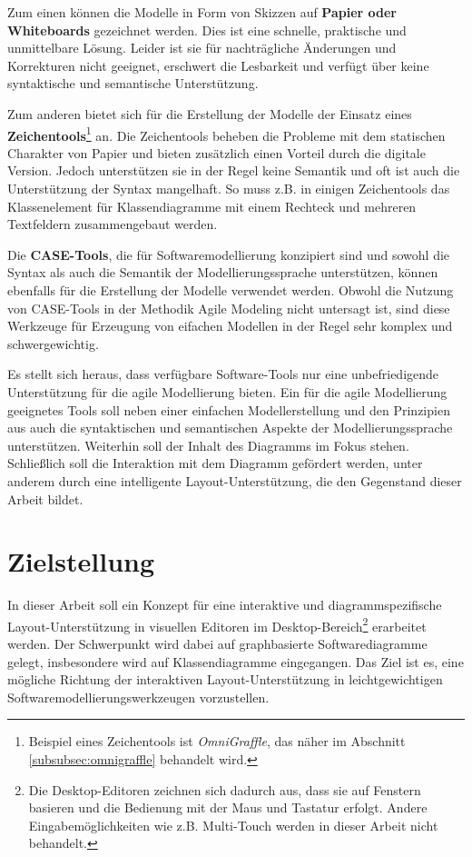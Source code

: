 Zum einen können die Modelle in Form von Skizzen auf \textbf{Papier oder Whiteboards} gezeichnet werden. Dies ist eine schnelle, praktische und unmittelbare Lösung. Leider ist sie für nachträgliche Änderungen und Korrekturen nicht geeignet, erschwert die Lesbarkeit und verfügt über keine syntaktische und semantische Unterstützung.

Zum anderen bietet sich für die Erstellung der Modelle der Einsatz eines \textbf{Zeichentools}\footnote{Beispiel eines Zeichentools ist \textit{OmniGraffle}, das näher im Abschnitt \ref{subsubsec:omnigraffle} behandelt wird.} an. Die Zeichentools beheben die Probleme mit dem statischen Charakter von Papier und bieten zusätzlich einen Vorteil durch die digitale Version. Jedoch unterstützen sie in der Regel keine Semantik und oft ist auch die Unterstützung der Syntax mangelhaft. So muss z.B. in einigen Zeichentools das Klassenelement für Klassendiagramme mit einem Rechteck und mehreren Textfeldern zusammengebaut werden.

Die \textbf{CASE-Tools}, die für Softwaremodellierung konzipiert sind und sowohl die Syntax als auch die Semantik der Modellierungssprache unterstützen, können ebenfalls für die Erstellung der Modelle verwendet werden. Obwohl die Nutzung von CASE-Tools in der Methodik Agile Modeling nicht untersagt ist, sind diese Werkzeuge für Erzeugung von eifachen Modellen in der Regel sehr komplex und schwergewichtig.

Es stellt sich heraus, dass verfügbare Software-Tools nur eine unbefriedigende Unterstützung für die agile Modellierung bieten. Ein für die agile Modellierung geeignetes Tools soll neben einer einfachen Modellerstellung und den Prinzipien aus \cite{Ambler02Agile} auch die syntaktischen und semantischen Aspekte der Modellierungssprache unterstützen. Weiterhin soll der Inhalt des Diagramms im Fokus stehen. Schließlich soll die Interaktion mit dem Diagramm gefördert werden, unter anderem durch eine intelligente Layout-Unterstützung, die den Gegenstand dieser Arbeit bildet.

\section{Zielstellung}

In dieser Arbeit soll ein Konzept für eine interaktive und diagrammspezifische Layout-Un\-ter\-stüt\-zung in visuellen Editoren im Desktop-Bereich\footnote{Die Desktop-Editoren zeichnen sich dadurch aus, dass sie auf Fenstern basieren und die Bedienung mit der Maus und Tastatur erfolgt. Andere Eingabemöglichkeiten wie z.B. Multi-Touch werden in dieser Arbeit nicht behandelt.} erarbeitet werden. Der Schwerpunkt wird dabei auf graphbasierte Softwarediagramme gelegt, insbesondere wird auf Klassendiagramme eingegangen. Das Ziel ist es, eine mögliche Richtung der interaktiven Layout-Unterstützung in leichtgewichtigen Softwaremodellierungswerkzeugen vorzustellen.

